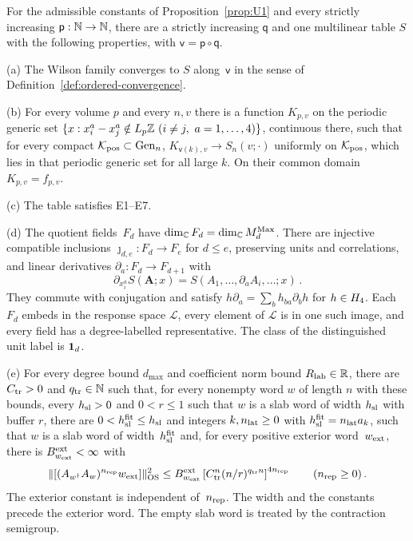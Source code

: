 \begin{proposition}\label{prop:P5}
For the admissible constants of Proposition~\ref{prop:U1} and every strictly increasing $\mathsf p:\mathbb{N}\to\mathbb{N}$, there are a strictly increasing $\mathsf q$ and one multilinear table $S$ with the following properties, with $\mathsf v=\mathsf p\circ\mathsf q$.

(a) The Wilson family converges to $S$ along~$\mathsf v$ in the sense of Definition~\ref{def:ordered-convergence}.

(b) For every volume $p$ and every $n,v$ there is a function $K_{p,v}$ on the periodic generic set $\{x:x_i^a-x_j^a\notin L_p\Z\ (i\ne j,\ a=1,\ldots,4)\}$, continuous there, such that for every compact $\mathcal K_{\rm pos}\subset\mathrm{Gen}_{n}$, $K_{\mathsf v(k),v}\to S_n(v;\cdot)$ uniformly on $\mathcal K_{\rm pos}$, which lies in that periodic generic set for all large $k$. On their common domain $K_{p,v}=f_{p,v}$.

(c) The table satisfies E1–E7.

(d) The quotient fields~$F_d$ have $\dim_{\mathbb{C}}F_d=\dim_{\mathbb{C}}M_{d}^{\mathrm{Max}}$. There are injective compatible inclusions $\jmath_{d,e}:F_d\to F_e$ for $d\le e$, preserving units and correlations, and linear derivatives $\partial_a:F_d\to F_{d+1}$ with
\begin{equation}\label{eq:P5-1}
\partial_{x_i^a}S(\boldsymbol A;x)=S(A_1,\ldots,\partial_aA_i,\ldots;x)\,.
\end{equation}
They commute with conjugation and satisfy $h\partial_a=\sum_bh_{ba}\partial_bh$ for $h\in H_4$. Each $F_d$ embeds in the response space $\mathcal L$, every element of $\mathcal L$ is in one such image, and every field has a degree-labelled representative. The class of the distinguished unit label is $\mathbf{1}_{d}$.

(e) For every degree bound $d_{\max}$ and coefficient norm bound $R_{\rm lab}\in\mathbb{R}$, there are $C_{\rm tr}>0$ and $q_{\rm tr}\in\mathbb{N}$ such that, for every nonempty word $w$ of length $n$ with these bounds, every $h_{\rm sl}>0$ and $0<r\le1$ such that $w$ is a slab word of width $h_{\rm sl}$ with buffer $r$, there are $0<h_{\rm sl}^{\rm fit}\le h_{\rm sl}$ and integers $k,n_{\rm lat}\ge0$ with $h_{\rm sl}^{\rm fit}=n_{\rm lat}a_k$, such that $w$ is a slab word of width~$h_{\rm sl}^{\rm fit}$ and, for every positive exterior word~$w_{\rm ext}$, there is $B_{w_{\rm ext}}^{\rm ext}<\infty$ with
\begin{equation}\label{eq:P5-2}
\|[(A_{w^\dagger}A_w)^{n_{\rm rep}}w_{\rm ext}]\|_{\mathrm{OS}}^2\le B_{w_{\rm ext}}^{\rm ext}\left[C_{\rm tr}^n(n/r)^{q_{\rm tr}n}\right]^{4n_{\rm rep}}\qquad(n_{\rm rep}\ge0)\,.
\end{equation}
The exterior constant is independent of~$n_{\rm rep}$. The width and the constants precede the exterior word. The empty slab word is treated by the contraction semigroup.
\end{proposition}

